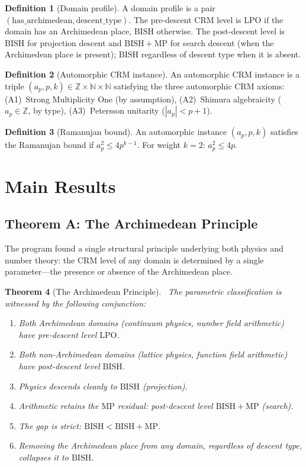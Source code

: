 \documentclass[11pt]{article}
\newtheorem{theorem}{Theorem}[section]
\theoremstyle{definition}
\newtheorem{definition}[theorem]{Definition}
\theoremstyle{remark}
\newcommand{\leanok}{\textsf{\small \textcolor{green!70!black}{\checkmark}}}
\newcommand{\N}{\mathbb{N}}
\newcommand{\Z}{\mathbb{Z}}
\newcommand{\BISH}{\mathrm{BISH}}
\newcommand{\LPO}{\mathrm{LPO}}
\newcommand{\MP}{\mathrm{MP}}
\begin{document}
\begin{definition}[Domain profile]
A domain profile is a pair $(\text{has\_archimedean}, \text{descent\_type})$. The pre-descent CRM level is $\LPO$ if the domain has an Archimedean place, $\BISH$ otherwise. The post-descent level is $\BISH$ for projection descent and $\BISH + \MP$ for search descent (when the Archimedean place is present); $\BISH$ regardless of descent type when it is absent.
\end{definition}

\begin{definition}[Automorphic CRM instance]
An automorphic CRM instance is a triple $(a_p, p, k) \in \Z \times \N \times \N$ satisfying the three automorphic CRM axioms: (A1)~Strong Multiplicity One (by assumption), (A2)~Shimura algebraicity ($a_p \in \Z$, by type), (A3)~Petersson unitarity ($|a_p| < p + 1$).
\end{definition}

\begin{definition}[Ramanujan bound]
An automorphic instance $(a_p, p, k)$ satisfies the Ramanujan bound if $a_p^2 \leq 4 p^{k-1}$. For weight $k = 2$: $a_p^2 \leq 4p$.
\end{definition}

\section{Main Results}
\label{sec:results}

\subsection{Theorem A: The Archimedean Principle}

The program found a single structural principle underlying both physics and number theory: the CRM level of any domain is determined by a single parameter---the presence or absence of the Archimedean place.

\begin{theorem}[The Archimedean Principle]
\label{thm:A}
\leanok\ The parametric classification is witnessed by the following conjunction:
\begin{enumerate}[label=\textnormal{(\roman*)}]
\item Both Archimedean domains (continuum physics, number field arithmetic) have pre-descent level $\LPO$.
\item Both non-Archimedean domains (lattice physics, function field arithmetic) have post-descent level $\BISH$.
\item Physics descends cleanly to $\BISH$ (projection).
\item Arithmetic retains the $\MP$ residual: post-descent level $\BISH + \MP$ (search).
\item The gap is strict: $\BISH < \BISH + \MP$.
\item Removing the Archimedean place from \emph{any} domain, regardless of descent type, collapses it to $\BISH$.
\end{enumerate}
\end{theorem}
\end{document}
